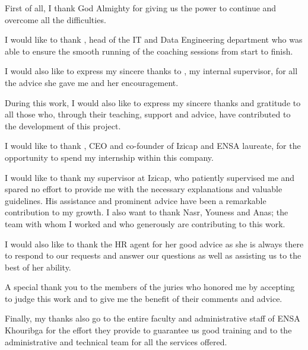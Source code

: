 \acknowledgements

First of all, I thank God Almighty for giving us the power to continue and overcome all the difficulties.
\medskip

I would like to thank \textbf{}, head of the IT and Data Engineering department who was able to ensure the smooth running of the coaching sessions from start to finish.

\medskip

I would also like to express my sincere thanks to \textbf{}, my internal supervisor, for all the advice she gave me and her encouragement.

\medskip

During this work, I would also like to express my sincere thanks and gratitude to all those who, through their teaching, support and advice, have contributed to the development of this project.

\medskip

I would like to thank \textbf{}, CEO and co-founder of Izicap and ENSA laureate, for the opportunity to spend my internship within this company.

\medskip

I would like to thank my supervisor at Izicap, \textbf{} who patiently supervised me and spared no effort to provide me with the necessary explanations and valuable guidelines. His assistance and prominent advice have been a remarkable contribution to my growth. I also want to thank Nasr, Youness and Anas; the team with whom I worked and who generously are contributing to this work.

\medskip

I would also like to thank the HR agent \textbf{} for her good advice as she is always there to respond to our requests and answer our questions as well as assisting us to the best of her ability.

\medskip

A special thank you to the members of the juries who honored me by accepting to judge this work and to give me the benefit of their comments and advice.

\medskip

Finally, my thanks also go to the entire faculty and administrative staff of ENSA Khouribga for the effort they provide to guarantee us good training and to the administrative and technical team for all the services offered.